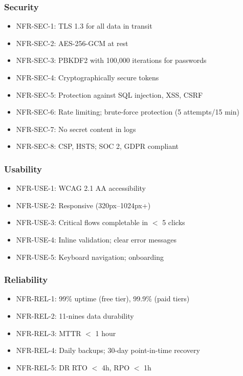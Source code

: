 \documentclass[12pt,a4paper]{article}
\begin{document}
\subsubsection*{Security}
\begin{itemize}[leftmargin=*, itemsep=0.1em]
  \item NFR-SEC-1: TLS 1.3 for all data in transit
  \item NFR-SEC-2: AES-256-GCM at rest
  \item NFR-SEC-3: PBKDF2 with 100,000 iterations for passwords
  \item NFR-SEC-4: Cryptographically secure tokens
  \item NFR-SEC-5: Protection against SQL injection, XSS, CSRF
  \item NFR-SEC-6: Rate limiting; brute-force protection (5 attempts/15 min)
  \item NFR-SEC-7: No secret content in logs
  \item NFR-SEC-8: CSP, HSTS; SOC 2, GDPR compliant
\end{itemize}

\subsubsection*{Usability}
\begin{itemize}[leftmargin=*, itemsep=0.1em]
  \item NFR-USE-1: WCAG 2.1 AA accessibility
  \item NFR-USE-2: Responsive (320px--1024px+)
  \item NFR-USE-3: Critical flows completable in $<$ 5 clicks
  \item NFR-USE-4: Inline validation; clear error messages
  \item NFR-USE-5: Keyboard navigation; onboarding
\end{itemize}

\subsubsection*{Reliability}
\begin{itemize}[leftmargin=*, itemsep=0.1em]
  \item NFR-REL-1: 99\% uptime (free tier), 99.9\% (paid tiers)
  \item NFR-REL-2: 11-nines data durability
  \item NFR-REL-3: MTTR $<$ 1 hour
  \item NFR-REL-4: Daily backups; 30-day point-in-time recovery
  \item NFR-REL-5: DR RTO $<$ 4h, RPO $<$ 1h
\end{itemize}
\end{document}
